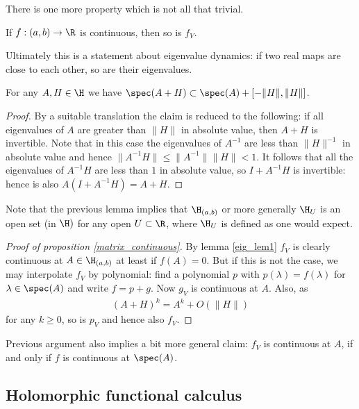 There is one more property which is not all that trivial.

\begin{prop}\label{matrix_continuous}
	If $f : (a, b) \to \R$ is continuous, then so is $f_{V}$.
\end{prop}

Ultimately this is a statement about eigenvalue dynamics: if two real maps are close to each other, so are their eigenvalues.
\begin{lem}\label{eig_lem1}
	For any $A, H \in \H$ we have $\spec(A + H) \subset \spec(A) + [-\|H\|, \|H\|]$.
\end{lem}
\begin{proof}
	By a suitable translation the claim is reduced to the following: if all eigenvalues of $A$ are greater than $\|H\|$ in absolute value, then $A + H$ is invertible. Note that in this case the eigenvalues of $A^{-1}$ are less than $\|H\|^{-1}$ in absolute value and hence $\|A^{-1} H\| \leq \|A^{-1}\| \|H\| < 1$. It follows that all the eigenvalues of $A^{-1} H$ are less than $1$ in absolute value, so $I + A^{-1} H$ is invertible: hence is also $A (I + A^{-1} H) = A + H$.
\end{proof}

Note that the previous lemma implies that $\H_{(a, b)}$ or more generally $\H_{U}$ is an open set (in $\H)$ for any open $U \subset \R$, where $\H_{U}$ is defined as one would expect.

\begin{proof}[Proof of proposition \ref{matrix_continuous}]
	By lemma \ref{eig_lem1} $f_{V}$ is clearly continuous at $A \in \H_{(a, b)}$ at least if $f(A) = 0$. But if this is not the case, we may interpolate $f_{V}$ by polynomial: find a polynomial $p$ with $p(\lambda) = f(\lambda)$ for $\lambda \in \spec(A)$ and write $f = p + g$. Now $g_{V}$ is continuous at $A$. Also, as
	\begin{align*}
		(A + H)^{k} = A^{k} + O(\|H\|)
	\end{align*}
	for any $k \geq 0$, so is $p_{V}$ and hence also $f_{V}$.
\end{proof}

Previous argument also implies a bit more general claim: $f_{V}$ is continuous at $A$, if and only if $f$ is continuous at $\spec(A)$.

\subsection{Holomorphic functional calculus}

